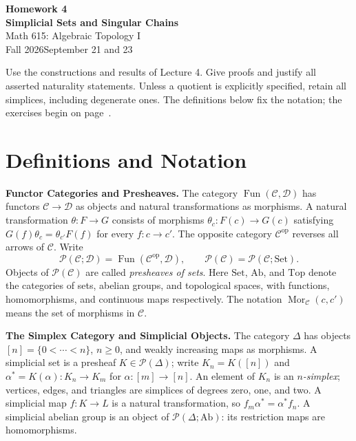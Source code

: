 \documentclass[11pt]{article}
\newcounter{result}[section]
\newcommand{\coursebold}[1]{{\color{burgundy}\textbf{#1}}}
\newcommand{\coursetitle}[3]{\begin{center}{\large\bfseries\color{teal}#1}\\[4pt]{\LARGE\bfseries\color{teal}#2}\\[6pt]Math 615: Algebraic Topology I\\Fall 2026\quad\textbar\quad #3\end{center}}
\newcommand{\Top}{\mathrm{Top}}
\newcommand{\Mor}{\operatorname{Mor}}
\begin{document}
\coursetitle{Homework 4}{Simplicial Sets and Singular Chains}{September 21 and 23}
Use the constructions and results of Lecture 4. Give proofs and justify
all asserted naturality statements. Unless a quotient is explicitly specified,
retain all simplices, including degenerate ones. The definitions below fix the
notation; the exercises begin on page~\pageref{ex:standard}.

\section*{Definitions and Notation}
\coursebold{Functor Categories and Presheaves.}
The category $\operatorname{Fun}(\mathcal C,\mathcal D)$ has functors
$\mathcal C\to\mathcal D$ as objects and natural transformations as morphisms.
A natural transformation $\theta:F\to G$ consists of morphisms
$\theta_c:F(c)\to G(c)$ satisfying
$G(f)\theta_c=\theta_{c'}F(f)$ for every $f:c\to c'$.
The opposite category $\mathcal C^{\mathrm{op}}$ reverses all arrows of
$\mathcal C$. Write
\[
\mathcal P(\mathcal C;\mathcal D)=\operatorname{Fun}(\mathcal C^{\mathrm{op}},\mathcal D),
\qquad
\mathcal P(\mathcal C)=\mathcal P(\mathcal C;\mathrm{Set}).
\]
Objects of $\mathcal P(\mathcal C)$ are called \emph{presheaves of sets}.
Here $\mathrm{Set}$, $\mathrm{Ab}$, and $\Top$ denote the categories of sets,
abelian groups, and topological spaces, with functions, homomorphisms, and
continuous maps respectively. The notation $\Mor_{\mathcal C}(c,c')$ means
the set of morphisms in $\mathcal C$.

\coursebold{The Simplex Category and Simplicial Objects.}
The category $\Delta$ has objects $[n]=\{0<\cdots<n\}$, $n\geq0$,
and weakly increasing maps as morphisms. A simplicial set is a presheaf
$K\in\mathcal P(\Delta)$; write $K_n=K([n])$ and
$\alpha^*=K(\alpha):K_n\to K_m$ for $\alpha:[m]\to[n]$.
An element of $K_n$ is an \emph{$n$-simplex}; vertices, edges, and triangles
are simplices of degrees zero, one, and two. A simplicial map $f:K\to L$
is a natural transformation, so $f_m\alpha^*=\alpha^*f_n$.
A simplicial abelian group is an object of
$\mathcal P(\Delta;\mathrm{Ab})$: its restriction maps are homomorphisms.
\end{document}
